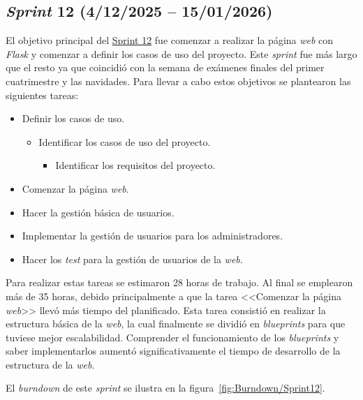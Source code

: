 \subsection{\textit{Sprint} 12 (4/12/2025 -- 15/01/2026)}
El objetivo principal del \href{https://github.com/lbr1014/TFG_RAG/milestone/12?closed=1}{Sprint 12} fue comenzar a realizar la página \textit{web} con \textit{Flask} y comenzar a definir los casos de uso del proyecto. Este \textit{sprint} fue más largo que el resto ya que coincidió con la semana de exámenes finales del primer cuatrimestre y las navidades. Para llevar a cabo estos objetivos se plantearon las siguientes tareas:
\begin{itemize}
\tightlist
	\item Definir los casos de uso.
	\begin{itemize}
	\tightlist
		\item Identificar los casos de uso del proyecto.
		\begin{itemize}
		\tightlist
			\item Identificar los requisitos del proyecto.
		\end{itemize}
	\end{itemize}
	\item Comenzar la página \textit{web}.
	\item Hacer la gestión básica de usuarios.
	\item Implementar la gestión de usuarios para los administradores.
	\item Hacer los \textit{test} para la gestión de usuarios de la \textit{web}.
\end{itemize}

Para realizar estas tareas se estimaron 28 horas de trabajo. Al final se emplearon más de 35 horas, debido principalmente a que la tarea <<Comenzar la página \textit{web}>> llevó más tiempo del planificado. Esta tarea consistió en realizar la estructura básica de la \textit{web}, la cual finalmente  se dividió en \textit{blueprints} para que tuviese mejor escalabilidad. Comprender el funcionamiento de los \textit{blueprints} y saber implementarlos aumentó significativamente el tiempo de desarrollo de la estructura de la \textit{web}.

El \textit{burndown} de este \textit{sprint} se ilustra en la figura~\ref{fig:Burndown/Sprint12}.

